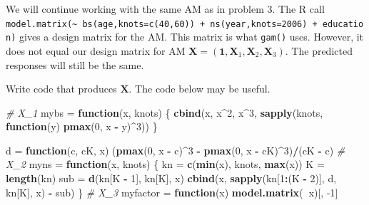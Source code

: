 \documentclass[]{article}
\newenvironment{Shaded}{\begin{snugshade}}{\end{snugshade}}
\newcommand{\CommentTok}[1]{\textcolor[rgb]{0.56,0.35,0.01}{\textit{#1}}}
\newcommand{\ControlFlowTok}[1]{\textcolor[rgb]{0.13,0.29,0.53}{\textbf{#1}}}
\newcommand{\DecValTok}[1]{\textcolor[rgb]{0.00,0.00,0.81}{#1}}
\newcommand{\KeywordTok}[1]{\textcolor[rgb]{0.13,0.29,0.53}{\textbf{#1}}}
\newcommand{\NormalTok}[1]{#1}
\newcommand{\OperatorTok}[1]{\textcolor[rgb]{0.81,0.36,0.00}{\textbf{#1}}}
\newcommand{\StringTok}[1]{\textcolor[rgb]{0.31,0.60,0.02}{#1}}
\begin{document}
We will continue working with the same AM as in problem 3. The R call
\texttt{model.matrix(\textasciitilde{}\ bs(age,knots=c(40,60))\ +\ ns(year,knots=2006)\ +\ education)}
gives a design matrix for the AM. This matrix is what \texttt{gam()}
uses. However, it does not equal our design matrix for AM
\(\mathbf X = (\mathbf{1}, \mathbf{X}_1, \mathbf{X}_2, \mathbf{X}_3)\).
The predicted responses will still be the same.

Write code that produces \(\mathbf X\). The code below may be useful.

\begin{Shaded}
\begin{Highlighting}[]
\CommentTok{# X_1}
\NormalTok{mybs =}\StringTok{ }\ControlFlowTok{function}\NormalTok{(x, knots) \{}
    \KeywordTok{cbind}\NormalTok{(x, x}\OperatorTok{^}\DecValTok{2}\NormalTok{, x}\OperatorTok{^}\DecValTok{3}\NormalTok{, }\KeywordTok{sapply}\NormalTok{(knots, }\ControlFlowTok{function}\NormalTok{(y) }\KeywordTok{pmax}\NormalTok{(}\DecValTok{0}\NormalTok{, x }\OperatorTok{-}\StringTok{ }\NormalTok{y)}\OperatorTok{^}\DecValTok{3}\NormalTok{))}
\NormalTok{\}}

\NormalTok{d =}\StringTok{ }\ControlFlowTok{function}\NormalTok{(c, cK, x) (}\KeywordTok{pmax}\NormalTok{(}\DecValTok{0}\NormalTok{, x }\OperatorTok{-}\StringTok{ }\NormalTok{c)}\OperatorTok{^}\DecValTok{3} \OperatorTok{-}\StringTok{ }\KeywordTok{pmax}\NormalTok{(}\DecValTok{0}\NormalTok{, x }\OperatorTok{-}\StringTok{ }\NormalTok{cK)}\OperatorTok{^}\DecValTok{3}\NormalTok{)}\OperatorTok{/}\NormalTok{(cK }\OperatorTok{-}\StringTok{ }\NormalTok{c)}
\CommentTok{# X_2}
\NormalTok{myns =}\StringTok{ }\ControlFlowTok{function}\NormalTok{(x, knots) \{}
\NormalTok{    kn =}\StringTok{ }\KeywordTok{c}\NormalTok{(}\KeywordTok{min}\NormalTok{(x), knots, }\KeywordTok{max}\NormalTok{(x))}
\NormalTok{    K =}\StringTok{ }\KeywordTok{length}\NormalTok{(kn)}
\NormalTok{    sub =}\StringTok{ }\KeywordTok{d}\NormalTok{(kn[K }\OperatorTok{-}\StringTok{ }\DecValTok{1}\NormalTok{], kn[K], x)}
    \KeywordTok{cbind}\NormalTok{(x, }\KeywordTok{sapply}\NormalTok{(kn[}\DecValTok{1}\OperatorTok{:}\NormalTok{(K }\OperatorTok{-}\StringTok{ }\DecValTok{2}\NormalTok{)], d, kn[K], x) }\OperatorTok{-}\StringTok{ }\NormalTok{sub)}
\NormalTok{\}}
\CommentTok{# X_3}
\NormalTok{myfactor =}\StringTok{ }\ControlFlowTok{function}\NormalTok{(x) }\KeywordTok{model.matrix}\NormalTok{(}\OperatorTok{~}\NormalTok{x)[, }\DecValTok{-1}\NormalTok{]}
\end{Highlighting}
\end{Shaded}
\end{document}
